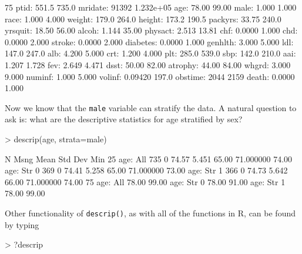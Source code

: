 \documentclass{article}
\begin{document}
\begin{Schunk}
\begin{Soutput}
             75%
    ptid:     551.5      735.0  
 mridate:     91392    1.232e+05
     age:     78.00      99.00  
    male:     1.000      1.000  
    race:     1.000      4.000  
  weight:     179.0      264.0  
  height:     173.2      190.5  
 packyrs:     33.75      240.0  
 yrsquit:     18.50      56.00  
   alcoh:     1.144      35.00  
 physact:     2.513      13.81  
     chf:     0.0000     1.000  
     chd:     0.0000     2.000  
  stroke:     0.0000     2.000  
diabetes:     0.0000     1.000  
 genhlth:     3.000      5.000  
     ldl:     147.0      247.0  
     alb:     4.200      5.000  
     crt:     1.200      4.000  
     plt:     285.0      539.0  
     sbp:     142.0      210.0  
     aai:     1.207      1.728  
     fev:     2.649      4.471  
    dsst:     50.00      82.00  
 atrophy:     44.00      84.00  
   whgrd:     3.000      9.000  
  numinf:     1.000      5.000  
  volinf:    0.09420     197.0  
 obstime:      2044      2159   
   death:     0.0000     1.000  
\end{Soutput}
\end{Schunk}
Now we know that the \texttt{male} variable can stratify the data. A natural question to ask is: what are the descriptive statistics for age stratified by sex?
\begin{Schunk}
\begin{Sinput}
> descrip(age, strata=male)
\end{Sinput}
\begin{Soutput}
               N     Msng  Mean      Std Dev    Min       25%
age:  All        735     0   74.57     5.451     65.00    71.000000   74.00  
age:    Str  0   369     0   74.41     5.258     65.00    71.000000   73.00  
age:    Str  1   366     0   74.73     5.642     66.00    71.000000   74.00  
                75%
age:  All        78.00     99.00  
age:    Str  0   78.00     91.00  
age:    Str  1   78.00     99.00  
\end{Soutput}
\end{Schunk}
Other functionality of \texttt{descrip()}, as with all of the functions in R, can be found by typing
\begin{Schunk}
\begin{Sinput}
> ?descrip
\end{Sinput}
\end{Schunk}
\end{document}
